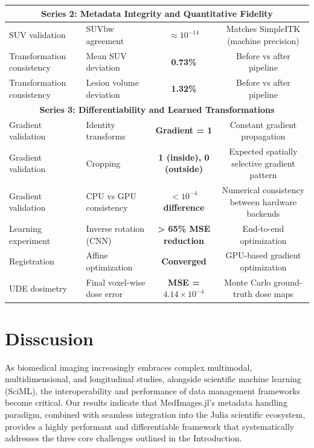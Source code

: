 \documentclass[a4paper,10pt]{elsarticle}
\begin{document}
\begin{table}[H]
\begin{tabular}{|l|l|c|c|}
\multicolumn{4}{|c|}{\textbf{Series 2: Metadata Integrity and Quantitative Fidelity}} \\
\hline
SUV validation & SUVbw agreement & \textbf{$\approx 10^{-14}$} & Matches SimpleITK (machine precision) \\
Transformation consistency & Mean SUV deviation & \textbf{0.73\%} & Before vs after pipeline \\
Transformation consistency & Lesion volume deviation & \textbf{1.32\%} & Before vs after pipeline \\
\hline
\multicolumn{4}{|c|}{\textbf{Series 3: Differentiability and Learned Transformations}} \\
\hline
Gradient validation & Identity transforms & \textbf{Gradient = 1} & Constant gradient propagation \\
Gradient validation & Cropping & \textbf{1 (inside), 0 (outside)} & Expected spatially selective gradient pattern\\
Gradient validation & CPU vs GPU consistency & \textbf{$< 10^{-4}$ difference} & Numerical consistency between hardware backends\\
Learning experiment & Inverse rotation (CNN) & \textbf{> 65\% MSE reduction} & End-to-end optimization\\
Registration & Affine optimization & \textbf{Converged} & GPU-based gradient optimization \\
 UDE dosimetry& Final voxel-wise dose error & \textbf{MSE = $4.14 \times 10^{-4}$} & Monte Carlo ground-truth dose maps\\
\hline
\end{tabular}
\end{table}

\section{ Disscusion}

As biomedical imaging increasingly embraces complex multimodal, multidimensional, and longitudinal studies, alongside scientific machine learning (SciML), the interoperability and performance of data management frameworks become critical. Our results indicate that MedImages.jl’s metadata handling paradigm, combined with seamless integration into the Julia scientific ecosystem, provides a highly performant and differentiable framework that systematically addresses the three core challenges outlined in the Introduction.  
\end{document}
